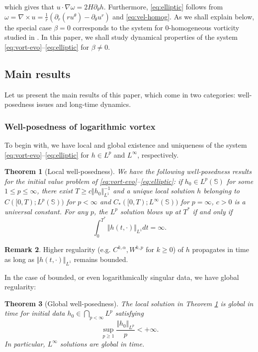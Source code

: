 \documentclass[JEP,XML,SOM,Unicode,NoFloatCountersInSection,published]{cedram}
\theoremstyle{plain}
\newtheorem{theorem}{Theorem}[section]
\theoremstyle{definition}
\newtheorem{remark}[theorem]{Remark}
\newcommand{\nrm}[1]{\Vert#1\Vert}
\let\rd\partial
\let\nb\nabla
\let\alp\alpha
\let\bt\beta
\let\tht\theta
\let\omg\omega
\newcommand{\bbS}{\mathbb S}
\begin{document}
which gives that $u\cdot\nb\omg = 2H\rd_\tht h$. Furthermore, \eqref{eq:elliptic} follows from $\omg = \nb\times u = \frac1r (\rd_r(ru^\tht) - \rd_\tht u^r)$ and \eqref{eq:vel-homog}. As we shall explain below, the special case $\bt=0$ corresponds to the system for $0$-homogeneous vorticity studied in \cite{EJ1,EMS}. In this paper, we shall study dynamical properties of the system \eqref{eq:vort-evo}--\eqref{eq:elliptic} for $\bt\ne0$.

\subsection{Main results}

Let us present the main results of this paper, which come in two categories: well-posedness issues and long-time dynamics.

\subsubsection*{Well-posedness of logarithmic vortex} To begin with, we have local and global existence and uniqueness of the system \eqref{eq:vort-evo}--\eqref{eq:elliptic} for $h\in L^p$ and $L^\infty$, respectively.
\begin{theorem}[Local well-posedness]\label{thm:wp-Lp}
We have the following well-posedness results for the initial value problem of \eqref{eq:vort-evo}--\eqref{eq:elliptic}: if $h_0 \in L^{p}(\bbS)$ for some $1\le p \le \infty$, there exist $T\ge c\nrm{h_0}_{L^{1}}^{-1}$ and a unique local solution $h$ belonging to $C([0,T);L^p(\bbS))$ for $p<\infty$ and $C_*([0,T);L^\infty(\bbS))$ for $p=\infty$, $c>0$ is a universal constant. For any $p$, the $L^p$ solution blows up at $T^*$ if and only if
\begin{equation*}
\int_0^{T^*} \nrm{h(t,\cdot)}_{L^{1}} dt = \infty.
\end{equation*}
\end{theorem}

\begin{remark}
Higher regularity (e.g. $C^{k,\alp}, W^{k,p}$ for $k\ge0$) of $h$ propagates in time as long as $\nrm{h(t,\cdot)}_{L^{1}}$ remains bounded.
\end{remark}

In the case of bounded, or even logarithmically singular data, we have global regularity:
\begin{theorem}[Global well-posedness]\label{thm:gwp}
The local solution in Theorem \ref{thm:wp-Lp} is global in time for initial data $h_0 \in \bigcap_{p<\infty} L^p$ satisfying
\begin{equation}\label{eq:Lp-log}
\sup_{p\ge 1} \frac{\nrm{h_0}_{L^p}}{p} < + \infty.
\end{equation}
In particular, $L^\infty$ solutions are global in time.
\end{theorem}
\end{document}
